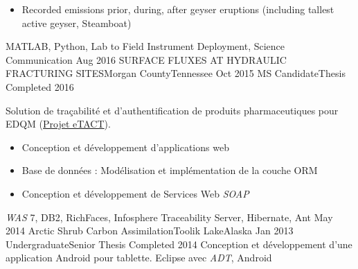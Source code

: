 \begin{experiences}
{\begin{itemize}
                        \item Recorded emissions prior, during, after geyser eruptions (including tallest active geyser, Steamboat)
                      \end{itemize}
                    }
                    {MATLAB, Python, Lab to Field Instrument Deployment, Science Communication}
  \emptySeparator
  \consultantexperience
  {Aug 2016}       {SURFACE FLUXES AT HYDRAULIC FRACTURING SITES}{Morgan County}{Tennessee}
  {Oct 2015}       {MS Candidate}{Thesis Completed 2016}
                   {
                      Solution de traçabilité et d'authentification de produits pharmaceutiques pour EDQM (\href{https://www.edqm.eu/fr/eTACT-1466.html}{Projet eTACT}).
                      \begin{itemize}
                        \item Conception et développement d'applications web                               
                        \item Base de données : Modélisation et implémentation de la couche ORM            
                        \item Conception et développement de Services Web \emph{SOAP}                      
                      \end{itemize}
                    }
                    {\emph{WAS} 7, DB2, RichFaces, Infosphere Traceability Server, Hibernate, Ant}
  \emptySeparator
  \consultantexperience
  {May 2014}        {Arctic Shrub Carbon Assimilation}{Toolik Lake}{Alaska}
  {Jan 2013}        {Undergraduate}{Senior Thesis Completed 2014}
                    {
                      Conception et développement d'une application Android pour tablette. 
                    }
                    {Eclipse avec \emph{ADT}, Android} 
\end{experiences}

